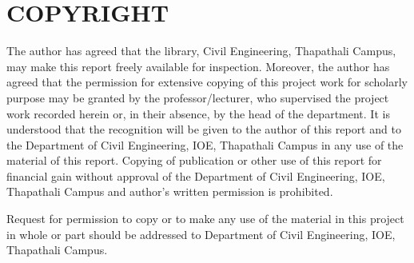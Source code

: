 \chapter*{COPYRIGHT}
{}

The author has agreed that the library, Civil Engineering, Thapathali Campus, may make this report freely 
available for inspection. Moreover, the author has agreed that the permission for extensive copying of this 
project work for scholarly purpose may be granted by the professor/lecturer, who supervised the project work 
recorded herein or, in their absence, by the head of the department. It is understood that the recognition will 
be given to the author of this report and to the Department of Civil Engineering, IOE, Thapathali Campus in any 
use of the material of this report. Copying of publication or other use of this report for financial gain without 
approval of the Department of Civil Engineering, IOE, Thapathali Campus and author's written permission is prohibited. 

Request for permission to copy or to make any use of the material in this project in whole or part should be addressed to Department of Civil
Engineering, IOE, Thapathali Campus.

